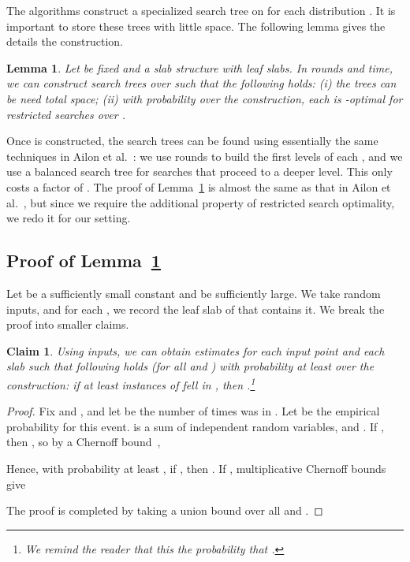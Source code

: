 \documentclass[letterpaper,11pt]{article}
\newtheorem{lemma}[theorem]{Lemma}
\newtheorem{claim}[theorem]{Claim}
\newcommand{\etal}{et al.}
\begin{document}
The algorithms construct a  
specialized search tree on  for 
each distribution .
It is important to store these
trees with little space.  
The following lemma gives the details
the construction.

\begin{lemma}\label{lem:tree} 
  Let  be fixed and
   a slab structure with  
  leaf slabs. In  rounds 
  and  time, we can 
  construct search trees  
  over  such that the following holds:
  \textup(i\textup) the trees can be 
  need  total space;
  \textup(ii\textup) with probability  
  over the construction, 
  each  is -optimal for 
  restricted searches over .
\end{lemma}

Once  is constructed,
the search trees  can 
be found using essentially 
the same techniques in 
Ailon \etal~\cite[Section~3.2]{AilonCCLMS11}:
we use  rounds to 
build the first
 levels of each , 
and we use a balanced search tree 
for searches that proceed to a deeper 
level. This only costs a factor of .
The proof of Lemma~\ref{lem:tree} is 
almost the same as that in 
Ailon \etal~\cite[Section~3.2]{AilonCCLMS11},
but since we require the additional
property of restricted search optimality,
we redo it for our setting. 

\subsection{Proof of Lemma~\ref{lem:tree}}
\label{sec:learning}

Let  be a sufficiently 
small constant and 
be sufficiently large. 
We take  
random inputs, and  for each , we 
record the leaf slab of  that 
contains it. We break the
proof into smaller claims.

\begin{claim} \label{clm:prob} 
  Using  inputs, we can
  obtain estimates 
   for each input point  
  and each slab  such that following 
  holds (for all  and )
  with probability at least  over 
  the construction: 
  if at least  
  instances of  fell in ,
  then .\footnote{We 
  remind the reader that this the
  probability that .}
\end{claim}

\begin{proof}
Fix  and , and
let  be the 
number of times 
was in . 
Let  
be the empirical 
probability for this event.
 is a sum of independent
random variables, and
.
If , 
then 
, so
by a Chernoff 
bound~\cite[Theorem~1.1, Eq. (1.8)]{DubhashiPa09}, 

Hence, with probability at 
least , if 
, 
then .
If ,  
multiplicative Chernoff 
bounds~\cite[Theorem 1.1, Eq. (1.7)]{DubhashiPa09}
give

The proof is completed by taking a union bound over all  and .
\end{proof}
\end{document}
